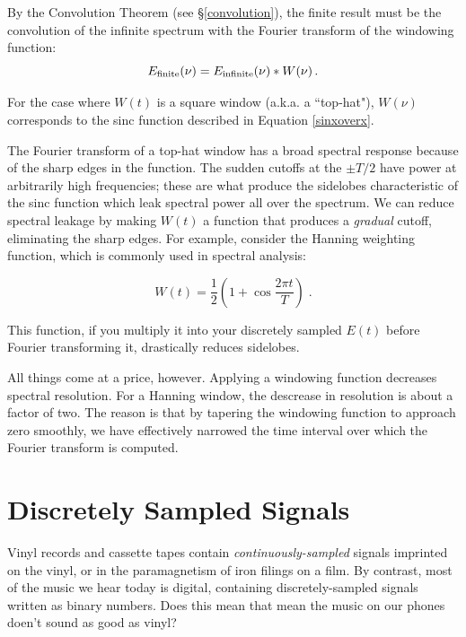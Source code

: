 \documentclass[11pt,preprint]{aastex}
\begin{document}
By the Convolution Theorem (see \S\ref{convolution}),
the finite result must be the convolution of the infinite spectrum
with the Fourier transform of the windowing function:
\begin{equation}
E_{\rm finite}(\nu) = E_{\rm infinite}(\nu) * W(\nu)\,.
\end{equation}

\noindent
For the case where $W(t)$ is a square window (a.k.a. a ``top-hat"),
$W(\nu)$ corresponds to the sinc function described in Equation \ref{sinxoverx}.

The Fourier transform of a top-hat window has a broad spectral response
because of the sharp edges in the function. The sudden cutoffs at the $\pm T/2$ 
have power at arbitrarily high frequencies; these are what produce the sidelobes
characteristic of the sinc function which leak spectral power all over the spectrum.
We can reduce spectral leakage by making $W(t)$ a function that
produces a {\it gradual} cutoff, eliminating the sharp edges.  For example,
consider the Hanning weighting function, which is commonly used in spectral analysis:

\begin{equation}
W(t) = \frac12 \left( 1 + \cos{\frac{2\pi t}{T}} \right) \; .
\label{weighting}
\end{equation}

\noindent This function, if you multiply it into your discretely sampled
$E(t)$ before Fourier transforming it, drastically reduces sidelobes.

All things come at a price, however. Applying a windowing function
decreases spectral resolution. For a Hanning window, the
descrease in resolution is about a factor of two.
The reason is that by tapering the windowing function to approach
zero smoothly, we have effectively narrowed the time interval over which the
Fourier transform is computed.


\section{Discretely Sampled Signals}

	Vinyl records and cassette tapes contain {\it
continuously-sampled} signals imprinted on the vinyl, or in the paramagnetism
of iron filings on a film. By contrast, most of the music we hear today
is digital, containing discretely-sampled signals written as binary numbers.
Does this mean that mean the music on our phones doen't sound as good as vinyl?
\end{document}
